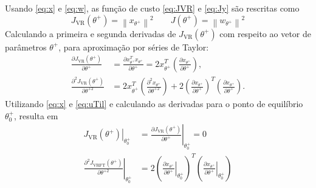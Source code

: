 Usando \eqref{eq:x} e \eqref{eq:w}, as função de custo \eqref{eq:JVR} e \eqref{eq:Jy} são rescritas como
$$
J_{\mathrm{VR}}\left(\theta^{+}\right)=\left\|x_{\theta^{+}}\right\|^{2} \qquad J\left(\theta^{+}\right)=\left\|w_{\theta^{+}}\right\|^{2}
$$
Calculando a primeira e segunda derivadas de $J_{\mathrm{VR}}\left(\theta^{+}\right)$ com respeito ao vetor de parâmetros $\theta^+$, para aproximação por séries de Taylor:
\begin{align}
   \frac{\partial J_{\mathrm{VR}}\left(\theta^{+}\right)}{\partial \theta^{+}} &=\frac{\partial x_{\theta^{+}}^{T} x_{\theta^{+}}}{\partial \theta^{+}} = 2 x_{\theta^{+}}^{T}\left(\frac{\partial x_{\theta^{+}}}{\partial \theta^{+}}\right), \\
\frac{\partial^{2} J_{\mathrm{VR}}\left(\theta^{+}\right)}{\partial \theta^{+2}}&= 2 x_{\theta^{+}}^{T}\left(\frac{\partial^{2} x_{\theta^{+}}}{\partial \theta^{+2}}\right)
+2\left(\frac{\partial x_{\theta^{+}}}{\partial \theta^{+}}\right)^{T}\left(\frac{\partial x_{\theta^{+}}}{\partial \theta^{+}}\right). 
\end{align}
Utilizando \eqref{eq:x} e \eqref{eq:uTil} e calculando as derivadas para o ponto de equilíbrio $\theta^{+}_0$, resulta em
\begin{align}
\left.J_{\mathrm{VR}}\left(\theta^{+}\right)\right|_{\theta_{0}^{+}}
& =\left.\frac{\partial J_{\mathrm{VR}}\left(\theta^{+}\right)}{\partial \theta^{+}}\right|_{\theta_{0}^{+}} =0 \label{eq:JVRTaylor_1}\\
   \left.\frac{\partial^{2} J_{\mathrm{VRFT}}\left(\theta^{+}\right)}{\partial \theta^{+2}}\right|_{\theta_{0}^{+}} &= 2\left(\left.\frac{\partial x_{\theta^{+}}}{\partial \theta^{+}}\right|_{\theta_{0}^{+}}\right)^{T}\left(\left.\frac{\partial x_{\theta^{+}}}{\partial \theta^{+}}\right|_{\theta_{0}^{+}}\right) \label{eq:JVRTaylor_2}
\end{align}

